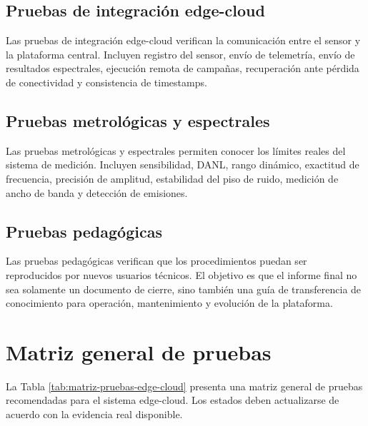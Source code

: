 \subsection{Pruebas de integración edge-cloud}

Las pruebas de integración edge-cloud verifican la comunicación entre el sensor y la plataforma central. Incluyen registro del sensor, envío de telemetría, envío de resultados espectrales, ejecución remota de campañas, recuperación ante pérdida de conectividad y consistencia de timestamps.

\subsection{Pruebas metrológicas y espectrales}

Las pruebas metrológicas y espectrales permiten conocer los límites reales del sistema de medición. Incluyen sensibilidad, DANL, rango dinámico, exactitud de frecuencia, precisión de amplitud, estabilidad del piso de ruido, medición de ancho de banda y detección de emisiones.

\subsection{Pruebas pedagógicas}

Las pruebas pedagógicas verifican que los procedimientos puedan ser reproducidos por nuevos usuarios técnicos. El objetivo es que el informe final no sea solamente un documento de cierre, sino también una guía de transferencia de conocimiento para operación, mantenimiento y evolución de la plataforma.

\section{Matriz general de pruebas}

La Tabla \ref{tab:matriz-pruebas-edge-cloud} presenta una matriz general de pruebas recomendadas para el sistema edge-cloud. Los estados deben actualizarse de acuerdo con la evidencia real disponible.

